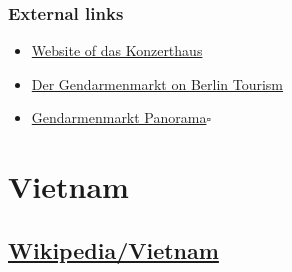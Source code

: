 \documentclass{book}
\numberwithin{equation}{section}
\begin{document}
\section{External links}
\begin{itemize}
    \item \href{http://www.konzerthaus.de/}{Website of das Konzerthaus}
    \item \href{https://web.archive.org/web/20070426024724/http://www.berlin-tourist-information.de/cgi-bin/sehenswertes.pl?id=13345&sprache=english}{Der Gendarmenmarkt on Berlin Tourism}
    \item \href{http://www.panorama-cities.net/berlin/gendarmenmarkt_5c.html}{Gendarmenmarkt Panorama}\hfill$\square$
\end{itemize}


\part{Vietnam}

\chapter{\href{https://en.wikipedia.org/wiki/Vietnam}{Wikipedia/Vietnam}}




\printbibliography[heading=bibintoc]
\end{document}
